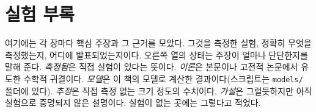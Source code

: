 \chapter{실험 부록}
\label{sec:supplement}

여기에는 각 장마다 핵심 주장과 그 근거를 모았다. 그것을 측정한 실험, 정확히 무엇을 측정했는지, 어디에 발표되었는지이다. 오른쪽 열의 상태는 주장이 얼마나 단단한지를 말해 준다. \emph{측정됨}은 직접 실험이 있다는 뜻이다. \emph{이론}은 본문이나 고전적 논문에서 유도한 수학적 귀결이다. \emph{모델}은 이 책의 모델로 계산한 결과이다(스크립트는 \texttt{models/} 폴더에 있다). \emph{추정}은 직접 측정 없는 크기 정도의 수치이다. \emph{가설}은 그럴듯하지만 아직 실험으로 증명되지 않은 설명이다. 실험이 없는 곳에는 그렇다고 적었다.























